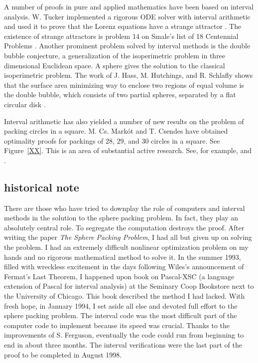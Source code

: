 A number of proofs in pure and applied mathematics have been based on interval analysis.  W. Tucker implemented a rigorous ODE solver with interval
arithmetic and used it to prove that the Lorenz equations
have a strange attractor \cite{Tuc02}. The existence of strange attractors is problem 14 on Smale's list
of 18 Centennial Problems \cite{Sma98}.  Another prominent problem solved
by interval methods is the double bubble conjecture, a generalization of
the isoperimetric problem in three dimensional Euclidean space.  A
sphere gives the solution to the classical isoperimetric problem.  The
work of J. Hass, M. Hutchings, and R. Schlafly shows that the surface
area minimizing way to enclose two regions of equal volume is the double
bubble, which consists of two partial spheres, separated by a flat 
circular disk \cite{HHS95}.

Interval arithmetic has also yielded a number  of new results on the 
problem of packing circles in a square. M. Cs. Mark\'ot and T. Csendes
have obtained optimality proofs for packings of $28$, $29$, and $30$ circles in
a square.
See Figure~\ref{XX}. %
This is an area of substantial active research. See, for example, 
\cite{Sza07} and \cite{Mar07}.




\subsection{historical note}

There are those who have tried to downplay the role of computers and interval
methods in the solution to the sphere packing problem.  In fact,
they play an absolutely central role.  To segregate the
computation destroys the proof.
After writing the paper {\it The Sphere Packing Problem}, I had all but given up
on solving the problem.  I had an extremely difficult nonlinear optimization problem
on my hands and no rigorous mathematical method to solve it.  In the summer  1993, 
filled with  wreckless excitement in the days following 
Wiles's announcement of Fermat's Last Theorem,
I happened upon
book on Pascal-XSC (a language extension of Pascal for interval analysis)
at the Seminary Coop Bookstore next to the University of
Chicago.  This book described the method I had lacked.
With fresh hope, in January 1994, 
I set aside all else and devoted full
effort to the sphere packing problem.   The interval code was the most difficult part of the computer code to implement because its speed was crucial.  Thanks to the improvements of S. Ferguson, eventually
the code could run from beginning to end in about three months.  
The interval verifications were the last part of the proof to be completed in August 1998. 


